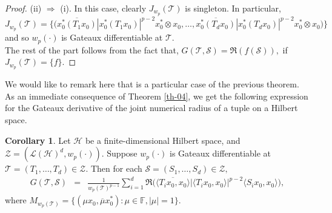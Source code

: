 \documentclass{amsart}
\theoremstyle{definition}
\newtheorem{cor}[theorem]{Corollary}
\theoremstyle{remark}
\numberwithin{equation}{section}
\begin{document}
\begin{proof}
  (ii) $\Rightarrow$ (i).  In this case, clearly $J_{w_p}(\mathcal{T})$ is singleton. In particular,
  $$J_{w_p}(\mathcal{T})=\bigg\{\bigg(\overline{x_0^*(T_1x_0)}|x_0^*(T_1x_0)|^{p-2}x_0^*\otimes x_0,\ldots,\overline{x_0^*(T_dx_0)}|x_0^*(T_dx_0)|^{p-2}x_0^*\otimes x_0\bigg)\bigg\}$$
   and so $w_p(\cdot)$ is Gateaux differentiable at $\mathcal{T}.$\\
   
   The rest of the part follows from the fact that, $	G(\mathcal{T},\mathcal{S})=\Re(f(\mathcal{S})),$ if $J_{w_p}(\mathcal{T})=\{f\}.$ 
\end{proof}

We would like to remark here that \cite[Th. 3.7]{M2} is a particular case of the previous theorem. As an immediate consequence of Theorem \ref{th-04}, we get the following expression for the Gateaux derivative of the joint numerical radius of a tuple on a Hilbert space.
\begin{cor}\label{cor-06}
	Let $\mathcal{H}$ be a finite-dimensional Hilbert space, and $\mathcal{Z}=(\mathcal{L}(\mathcal{H})^d,w_p(\cdot)).$ Suppose  $w_p(\cdot)$ is Gateaux differentiable at $\mathcal{T}=(T_1,\ldots,T_d)\in \mathcal{Z}.$ Then for each $\mathcal{S}=(S_1,\ldots,S_d) \in \mathcal{Z},$ 
	\begin{eqnarray*}
			G(\mathcal{T},\mathcal{S})
		&=&\frac{1}{w_p(\mathcal{T})^{p-1}}\sum_{i=1}^d\Re\bigg(\overline{\langle T_ix_0,x_0\rangle} |\langle T_ix_0,x_0\rangle|^{p-2}\langle S_ix_0,x_0\rangle \bigg),
	\end{eqnarray*}
where $M_{w_p(\mathcal{T})}=\{(\mu x_0, \overline{\mu} x_0^*):\mu\in \mathbb{F},|\mu|=1\}.$
\end{cor}
\end{document}
